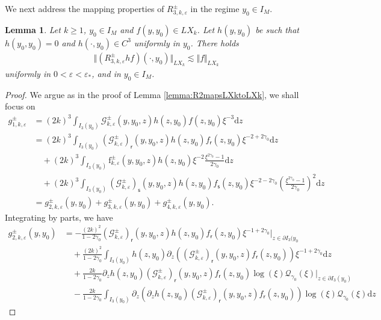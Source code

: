 \documentclass[11pt,reqno]{amsproc}
\newtheorem{lemma}[proposition]{Lemma}
\theoremstyle{definition}
\numberwithin{equation}{section}
\newcommand{\G}{{\mathcal{G}}}
\newcommand{\Q}{{\mathcal{Q}}}
\newcommand{\sr}{{\mathsf{r}}}
\newcommand{\s}{{\mathsf{s}}}
\renewcommand{\d}{\mathrm{d}}
\newcommand{\ep}{\varepsilon}
\begin{document}
We next address the mapping properties of $R_{3,k,\ep}^\pm$ in the regime $y_0\in I_M$.

\begin{lemma}\label{lemma:R3mapsC1LXktoLXk}
Let $k\geq 1$, $y_0\in I_M$ and $f(y,y_0)\in LX_k$. Let $h(y,y_0)$ be such that $h(y_0,y_0)=0$ and $h(\cdot,y_0)\in C^3$ uniformly in $y_0$. There holds
\begin{align*}
\Vert (R_{3,k,\ep}^\pm hf)(\cdot,y_0) \Vert_{LX_k} \lesssim  \Vert f \Vert_{LX_k} 
\end{align*}
uniformly in $0<\ep<\ep_*$, and in $y_0\in I_M$.
\end{lemma}

\begin{proof}
We argue as in the proof of Lemma \ref{lemma:R2mapsLXktoLXk}, we shall focus on
\begin{align*}
g_{1,k,\ep}^\pm &= (2k)^3\int_{I_3(y_0)} \G_{k,\ep}^\pm(y,y_0,z) h(z,y_0) f(z,y_0) \xi^{-3}\d z \\
&= (2k)^3 \int_{I_3(y_0)} \left( \G_{k,\ep}^\pm \right)_\sr(y,y_0,z) h(z,y_0) f_\sr(z, y_0)\xi^{-2+2\gamma_0} \d z \\
&\quad + (2k)^3\int_{I_3(y_0)} \mathrm{f}_{k,\ep}^\pm(y,y_0,z) h(z,y_0)\xi^{-2}\frac{\xi^{2\gamma_0}-1}{2\gamma_0} \d z \\
&\quad + (2k)^3 \int_{I_3(y_0)} \left( \G_{k,\ep}^\pm \right)_\s (y,y_0,z) h(z,y_0) f_\s(z, y_0)\xi^{-2-2\gamma_0} \left( \frac{\xi^{2\gamma_0}-1}{2\gamma_0} \right)^2 \d z \\
&= g_{2,k,\ep}^\pm(y,y_0) + g_{3,k,\ep}^\pm(y,y_0) + g_{4,k,\ep}^\pm(y,y_0).
\end{align*}
Integrating by parts, we have
\begin{align*}
g_{2,k,\ep}^\pm(y,y_0) &= -\frac{(2k)^2}{1-2\gamma_0}  \left( \G_{k,\ep}^\pm \right)_\sr(y,y_0,z) h(z,y_0) f_\sr(z, y_0)\xi^{-1+2\gamma_0} \Big|_{z\in \partial I_3(y_0} \\
&\quad + \frac{(2k)^2}{1-2\gamma_0}\int_{I_3(y_0)}   h(z,y_0) \partial_z \left(  \left( \G_{k,\ep}^\pm \right)_\sr(y,y_0,z)  f_\sr(z, y_0) \right) \xi^{-1+2\gamma_0} \d z \\
&\quad + \frac{2k}{1-2\gamma_0}\partial_z h(z,y_0) \left( \G_{k,\ep}^\pm \right)_\sr(y,y_0,z)  f_\sr(z, y_0) \log(\xi) \Q_{\gamma_0}(\xi) \Big|_{z\in \partial I_3(y_0)} \\
&\quad - \frac{2k}{1-2\gamma_0} \int_{I_3(y_0)} \partial_z \left( \partial_z h(z,y_0) \left( \G_{k,\ep}^\pm \right)_\sr(y,y_0,z)  f_\sr(z, y_0) \right) \log(\xi) \Q_{\gamma_0}(\xi)  \d z

\end{align*}
\end{proof}
\end{document}
